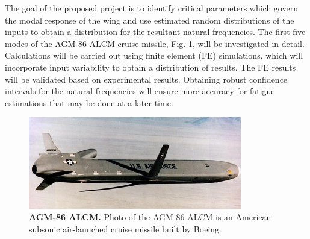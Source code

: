 \documentclass[paper=a4, fontsize=12pt]{scrartcl} %
\begin{document}
The goal of the proposed project is to identify critical parameters which govern the modal response of the wing and use estimated random distributions of the inputs to obtain a distribution for the resultant natural frequencies. The first five modes of the AGM-86 ALCM cruise missile, Fig. \ref{fig:cruiseMissile}, will be investigated in detail. Calculations will be carried out using finite element (FE) simulations, which will incorporate input variability to obtain a distribution of results. The FE results will be validated based on experimental results. Obtaining robust confidence intervals for the natural frequencies will ensure more accuracy for fatigue estimations that may be done at a later time. 
%
\begin{figure}[H]
	\centering
	\includegraphics[height = 4.0cm]{Pictures/agm-86c.jpg}
	\caption{\textbf{AGM-86 ALCM.} Photo of the AGM-86 ALCM is an American subsonic air-launched cruise missile built by Boeing.}
	\label{fig:cruiseMissile}
\end{figure}
%
\end{document}
